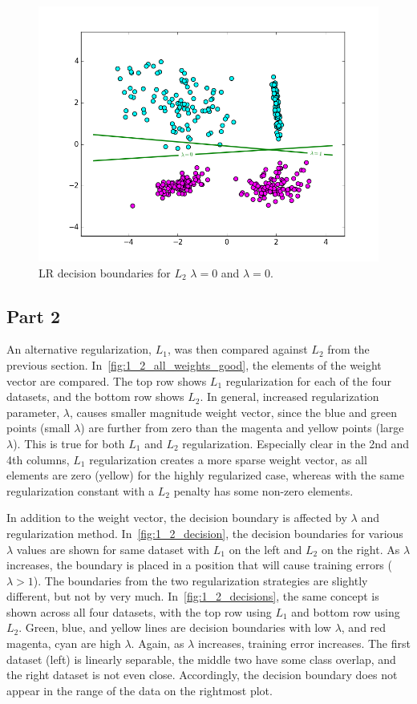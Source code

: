 \begin{figure}
	\centering
	\includegraphics [trim=0 0 0 0, clip, angle=0, width=0.8\columnwidth,
	keepaspectratio]{figures/1_1_decision}
	\caption{LR decision boundaries for $L_2$ $\lambda=0$ and $\lambda=0$.}
	\label{fig:1_1_decision} 
\end{figure}

\subsection{Part 2}
An alternative regularization, $L_1$, was then compared against $L_2$ from the previous section.
In~\cref{fig:1_2_all_weights_good}, the elements of the weight vector are compared.
The top row shows $L_1$ regularization for each of the four datasets, and the bottom row shows $L_2$.
In general, increased regularization parameter, $\lambda$, causes smaller magnitude weight vector, since the blue and green points (small $\lambda$) are further from zero than the magenta and yellow points (large $\lambda$).
This is true for both $L_1$ and $L_2$ regularization.
Especially clear in the 2nd and 4th columns, $L_1$ regularization creates a more sparse weight vector, as all elements are zero (yellow) for the highly regularized case, whereas with the same regularization constant with a $L_2$ penalty has some non-zero elements.

In addition to the weight vector, the decision boundary is affected by $\lambda$ and regularization method.
In~\cref{fig:1_2_decision}, the decision boundaries for various $\lambda$ values are shown for same dataset with $L_1$ on the left and $L_2$ on the right.
As $\lambda$ increases, the boundary is placed in a position that will cause training errors ($\lambda > 1$).
The boundaries from the two regularization strategies are slightly different, but not by very much.
In~\cref{fig:1_2_decisions}, the same concept is shown across all four datasets, with the top row using $L_1$ and bottom row using $L_2$.
Green, blue, and yellow lines are decision boundaries with low $\lambda$, and red magenta, cyan are high $\lambda$.
Again, as $\lambda$ increases, training error increases. The first dataset (left) is linearly separable, the middle two have some class overlap, and the right dataset is not even close.
Accordingly, the decision boundary does not appear in the range of the data on the rightmost plot.

